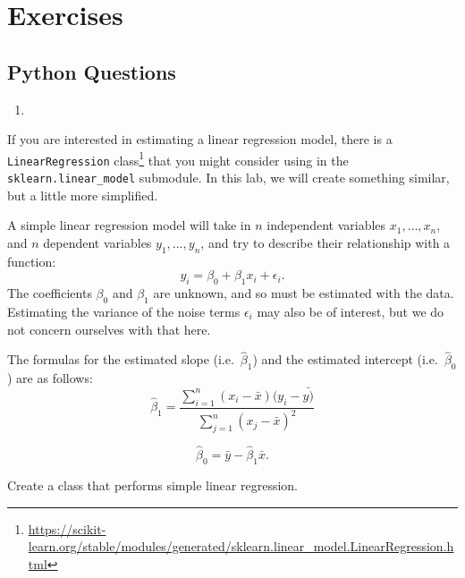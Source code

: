 \documentclass[
  12pt,
  krantz2]{krantz}
\providecommand{\tightlist}{%
  \setlength{\itemsep}{0pt}\setlength{\parskip}{0pt}}
\renewcommand{\href}[2]{#2\footnote{\url{#1}}}
\begin{document}
\hypertarget{exercises-11}{%
\section{Exercises}\label{exercises-11}}

\hypertarget{python-questions-10}{%
\subsection{Python Questions}\label{python-questions-10}}

\begin{enumerate}
\def\labelenumi{\arabic{enumi}.}
\tightlist
\item
\end{enumerate}

If you are interested in estimating a linear regression model, there is a \href{https://scikit-learn.org/stable/modules/generated/sklearn.linear_model.LinearRegression.html}{\texttt{LinearRegression} class} that you might consider using in the \texttt{sklearn.linear\_model} submodule. In this lab, we will create something similar, but a little more simplified.

A simple linear regression model will take in \(n\) independent variables \(x_1, \ldots, x_n\), and \(n\) dependent variables \(y_1, \ldots, y_n\), and try to describe their relationship with a function:
\[
y_i = \beta_0 + \beta_1 x_i + \epsilon_i.
\]
The coefficients \(\beta_0\) and \(\beta_1\) are unknown, and so must be estimated with the data. Estimating the variance of the noise terms \(\epsilon_i\) may also be of interest, but we do not concern ourselves with that here.

The formulas for the estimated slope (i.e.~\(\hat{\beta}_1\)) and the estimated intercept (i.e.~\(\hat{\beta}_0\)) are as follows:
\[
\hat{\beta}_1 = \frac{\sum_{i=1}^n (x_i - \bar{x})(y_i-\bar{y)}}{\sum_{j=1}^n (x_j - \bar{x})^2} 
\]

\[
\hat{\beta}_0 = \bar{y} - \hat{\beta}_1\bar{x}.
\]

Create a class that performs simple linear regression.
\end{document}
